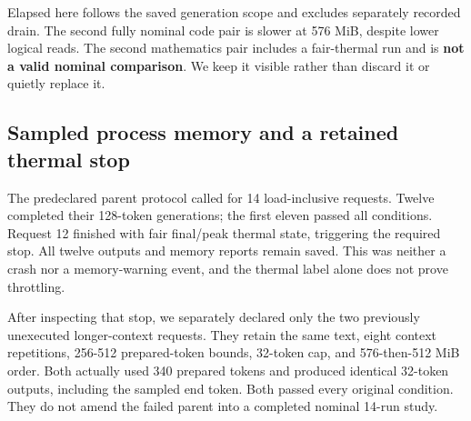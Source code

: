 \documentclass[11pt]{article}
\begin{document}
Elapsed here follows the saved generation scope and excludes separately
recorded drain. The second fully nominal code pair is slower at 576 MiB,
despite lower logical reads. The second mathematics pair includes a
fair-thermal run and is \textbf{not a valid nominal comparison}. We keep it
visible rather than discard it or quietly replace it.

\hypertarget{sampled-process-memory-and-a-retained-thermal-stop}{%
\subsection{Sampled process memory and a retained thermal stop}\label{sampled-process-memory-and-a-retained-thermal-stop}}

The predeclared parent protocol called for 14 load-inclusive requests.
Twelve completed their 128-token generations; the first eleven passed
all conditions. Request 12 finished with fair final/peak thermal state,
triggering the required stop. All twelve outputs and memory reports
remain saved. This was neither a crash nor a memory-warning event, and
the thermal label alone does not prove throttling.

After inspecting that stop, we separately declared only the two previously
unexecuted longer-context requests. They retain the same text, eight
context repetitions, 256-512 prepared-token bounds, 32-token cap, and
576-then-512 MiB order. Both actually used
340 prepared tokens and produced identical 32-token
outputs, including the sampled end token. Both passed every original
condition. They do not amend the failed parent into a completed nominal
14-run study.
\end{document}
